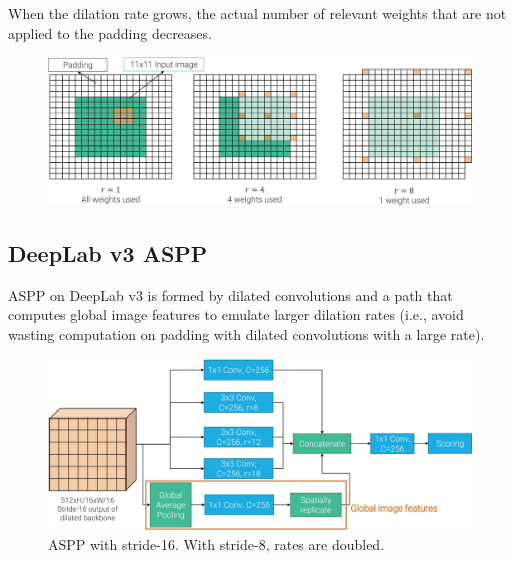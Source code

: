 \begin{subappendices}
    \begin{remark}
        When the dilation rate grows, the actual number of relevant weights that are not applied to the padding decreases.

        \begin{figure}[H]
            \centering
            \includegraphics[width=0.8\linewidth]{./img/_dilated_conv_weights.jpg}
        \end{figure}
    \end{remark}


    \subsection{DeepLab v3 ASPP}

    ASPP on DeepLab v3 is formed by dilated convolutions and a path that computes global image features to emulate larger dilation rates (i.e., avoid wasting computation on padding with dilated convolutions with a large rate).

    \begin{figure}[H]
        \centering
        \includegraphics[width=0.75\linewidth]{./img/_deeplabv3_aspp.jpg}
        \caption{
            ASPP with stride-16. With stride-8, rates are doubled.
        }
    \end{figure}
\end{subappendices}
